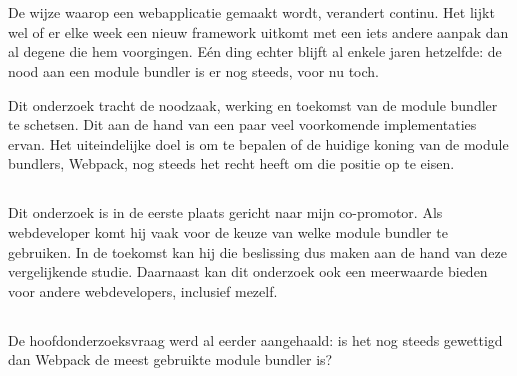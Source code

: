 
\chapter{}
\label{ch:inleiding}

De wijze waarop een webapplicatie gemaakt wordt, verandert continu. Het lijkt wel of er elke week een nieuw framework uitkomt met een iets andere aanpak dan al degene die hem voorgingen. Eén ding echter blijft al enkele jaren hetzelfde: de nood aan een module bundler is er nog steeds, voor nu toch.

Dit onderzoek tracht de noodzaak, werking en toekomst van de module bundler te schetsen. Dit aan de hand van een paar veel voorkomende implementaties ervan. Het uiteindelijke doel is om te bepalen of de huidige koning van de module bundlers, Webpack, nog steeds het recht heeft om die positie op te eisen.

\section{}
\label{sec:probleemstelling}

Dit onderzoek is in de eerste plaats gericht naar mijn co-promotor. Als webdeveloper komt hij vaak voor de keuze van welke module bundler te gebruiken. In de toekomst kan hij die beslissing dus maken aan de hand van deze vergelijkende studie. Daarnaast kan dit onderzoek ook een meerwaarde bieden voor andere webdevelopers, inclusief mezelf. 

\section{}
\label{sec:onderzoeksvraag}

De hoofdonderzoeksvraag werd al eerder aangehaald: is het nog steeds gewettigd dan Webpack de meest gebruikte module bundler is? 

\section{}
\label{sec:onderzoeksdoelstelling}

